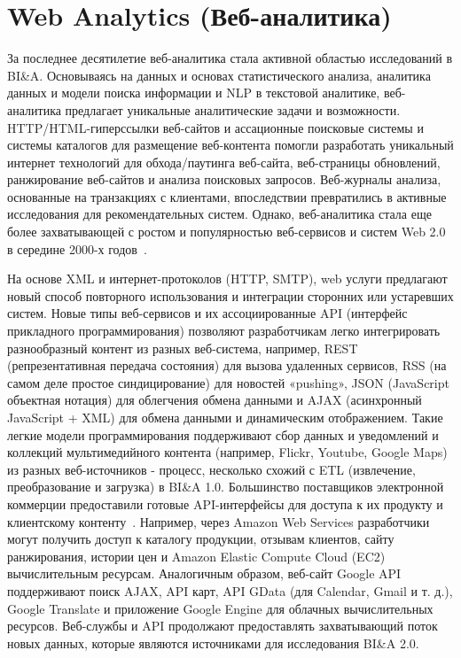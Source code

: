 \section{Web Analytics (Веб-аналитика)}

За последнее десятилетие веб-аналитика стала активной
областью исследований в BI\&A. Основываясь на данных
и основах статистического анализа, аналитика данных и
модели поиска информации и NLP в текстовой аналитике,
веб-аналитика предлагает уникальные аналитические задачи и
возможности. HTTP/HTML-гиперссылки веб-сайтов и
ассационные поисковые системы и системы каталогов для
размещение веб-контента помогли разработать уникальный интернет технологий для обхода/паутинга веб-сайта, веб-страницы обновлений, ранжирование веб-сайтов и анализа поисковых запросов. Веб-журналы
анализа, основанные на транзакциях с клиентами, впоследствии
превратились в активные исследования для рекомендательных систем. Однако,
веб-аналитика стала еще более захватывающей с
ростом и популярностью веб-сервисов и систем Web 2.0
в середине 2000-х годов~\cite{OReilly:2005}.

На основе XML и интернет-протоколов (HTTP, SMTP), web
услуги предлагают новый способ повторного использования и интеграции сторонних
или устаревших систем. Новые типы веб-сервисов и их
ассоциированные API (интерфейс прикладного программирования) позволяют
разработчикам легко интегрировать разнообразный контент из разных
веб-система, например, REST (репрезентативная
передача состояния) для вызова удаленных сервисов, RSS (на самом деле
простое синдицирование) для новостей «pushing», JSON (JavaScript
объектная нотация) для облегчения обмена данными и AJAX
(асинхронный JavaScript + XML) для обмена данными и
динамическим отображением. Такие легкие модели программирования
поддерживают сбор данных и уведомлений и коллекций
мультимедийного контента (например, Flickr, Youtube, Google Maps)
из разных веб-источников - процесс, несколько схожий с
ETL (извлечение, преобразование и загрузка) в BI\&A 1.0.
Большинство поставщиков электронной коммерции предоставили готовые API-интерфейсы
для доступа к их продукту и клиентскому контенту~\cite{Schonfeld:2005}. Например, через Amazon Web Services разработчики
могут получить доступ к каталогу продукции, отзывам клиентов, сайту
ранжирования, истории цен и Amazon Elastic Compute
Cloud (EC2) вычислительным ресурсам. Аналогичным образом, веб-сайт Google
API поддерживают поиск AJAX, API карт, API GData (для
Calendar, Gmail и т. д.), Google Translate и приложение Google Engine для облачных вычислительных ресурсов. Веб-службы и
API продолжают предоставлять захватывающий поток новых данных, которые являются
источниками для исследования BI\&A 2.0.

